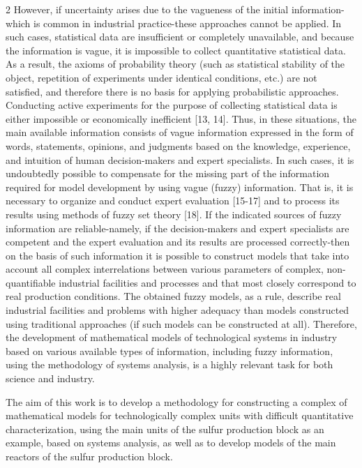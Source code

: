 \begin{multicols}{2}
However, if uncertainty arises due to the vagueness of the initial
information-which is common in industrial practice-these approaches
cannot be applied. In such cases, statistical data are insufficient or
completely unavailable, and because the information is vague, it is
impossible to collect quantitative statistical data. As a result, the
axioms of probability theory (such as statistical stability of the
object, repetition of experiments under identical conditions, etc.) are
not satisfied, and therefore there is no basis for applying
probabilistic approaches. Conducting active experiments for the purpose
of collecting statistical data is either impossible or economically
inefficient {[}13, 14{]}. Thus, in these situations, the main available
information consists of vague information expressed in the form of
words, statements, opinions, and judgments based on the knowledge,
experience, and intuition of human decision-makers and expert
specialists. In such cases, it is undoubtedly possible to compensate for
the missing part of the information required for model development by
using vague (fuzzy) information. That is, it is necessary to organize
and conduct expert evaluation {[}15-17{]} and to process its results
using methods of fuzzy set theory {[}18{]}. If the indicated sources of
fuzzy information are reliable-namely, if the decision-makers and expert
specialists are competent and the expert evaluation and its results are
processed correctly-then on the basis of such information it is possible
to construct models that take into account all complex interrelations
between various parameters of complex, non-quantifiable industrial
facilities and processes and that most closely correspond to real
production conditions. The obtained fuzzy models, as a rule, describe
real industrial facilities and problems with higher adequacy than models
constructed using traditional approaches (if such models can be
constructed at all). Therefore, the development of mathematical models
of technological systems in industry based on various available types of
information, including fuzzy information, using the methodology of
systems analysis, is a highly relevant task for both science and
industry.

The aim of this work is to develop a methodology for constructing a
complex of mathematical models for technologically complex units with
difficult quantitative characterization, using the main units of the
sulfur production block as an example, based on systems analysis, as
well as to develop models of the main reactors of the sulfur production
block.


\end{multicols}

